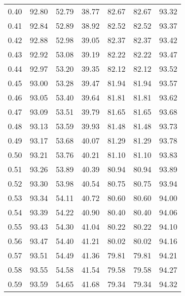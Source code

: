 \begin{tabular}{|c|c|c|c|c|c|c|}
      0.40 &     92.80 &     52.79 &      38.77 &   82.67 &      82.67 &         93.32 \\
      0.41 &     92.84 &     52.89 &      38.92 &   82.52 &      82.52 &         93.37 \\
      0.42 &     92.88 &     52.98 &      39.05 &   82.37 &      82.37 &         93.42 \\
      0.43 &     92.92 &     53.08 &      39.19 &   82.22 &      82.22 &         93.47 \\
      0.44 &     92.97 &     53.20 &      39.35 &   82.12 &      82.12 &         93.52 \\
      0.45 &     93.00 &     53.28 &      39.47 &   81.94 &      81.94 &         93.57 \\
      0.46 &     93.05 &     53.40 &      39.64 &   81.81 &      81.81 &         93.62 \\
      0.47 &     93.09 &     53.51 &      39.79 &   81.65 &      81.65 &         93.68 \\
      0.48 &     93.13 &     53.59 &      39.93 &   81.48 &      81.48 &         93.73 \\
      0.49 &     93.17 &     53.68 &      40.07 &   81.29 &      81.29 &         93.78 \\
      0.50 &     93.21 &     53.76 &      40.21 &   81.10 &      81.10 &         93.83 \\
      0.51 &     93.26 &     53.89 &      40.39 &   80.94 &      80.94 &         93.89 \\
      0.52 &     93.30 &     53.98 &      40.54 &   80.75 &      80.75 &         93.94 \\
      0.53 &     93.34 &     54.11 &      40.72 &   80.60 &      80.60 &         94.00 \\
      0.54 &     93.39 &     54.22 &      40.90 &   80.40 &      80.40 &         94.06 \\
      0.55 &     93.43 &     54.30 &      41.04 &   80.22 &      80.22 &         94.10 \\
      0.56 &     93.47 &     54.40 &      41.21 &   80.02 &      80.02 &         94.16 \\
      0.57 &     93.51 &     54.49 &      41.36 &   79.81 &      79.81 &         94.21 \\
      0.58 &     93.55 &     54.58 &      41.54 &   79.58 &      79.58 &         94.27 \\
      0.59 &     93.59 &     54.65 &      41.68 &   79.34 &      79.34 &         94.32 \\

\end{tabular}
